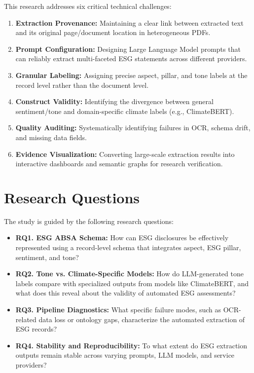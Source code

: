 This research addresses six critical technical challenges:
\begin{enumerate}
\item 

\textbf{Extraction Provenance:} Maintaining a clear link between extracted text and its original page/document location in heterogeneous PDFs.\item 

\textbf{Prompt Configuration:} Designing Large Language Model prompts that can reliably extract multi-faceted ESG statements across different providers.\item 

\textbf{Granular Labeling:} Assigning precise aspect, pillar, and tone labels at the record level rather than the document level.\item 

\textbf{Construct Validity:} Identifying the divergence between general sentiment/tone and domain-specific climate labels (e.g., ClimateBERT).\item 

\textbf{Quality Auditing:} Systematically identifying failures in OCR, schema drift, and missing data fields.\item 

\textbf{Evidence Visualization:} Converting large-scale extraction results into interactive dashboards and semantic graphs for research verification.
\end{enumerate}
\section{Research Questions}

The study is guided by the following research questions:
\begin{itemize}
\item 

\textbf{RQ1. ESG ABSA Schema:} How can ESG disclosures be effectively represented using a record-level schema that integrates aspect, ESG pillar, sentiment, and tone?\item 

\textbf{RQ2. Tone vs. Climate-Specific Models:} How do LLM-generated tone labels compare with specialized outputs from models like ClimateBERT, and what does this reveal about the validity of automated ESG assessments?\item 

\textbf{RQ3. Pipeline Diagnostics:} What specific failure modes, such as OCR-related data loss or ontology gaps, characterize the automated extraction of ESG records?\item 

\textbf{RQ4. Stability and Reproducibility:} To what extent do ESG extraction outputs remain stable across varying prompts, LLM models, and service providers?
\end{itemize}

